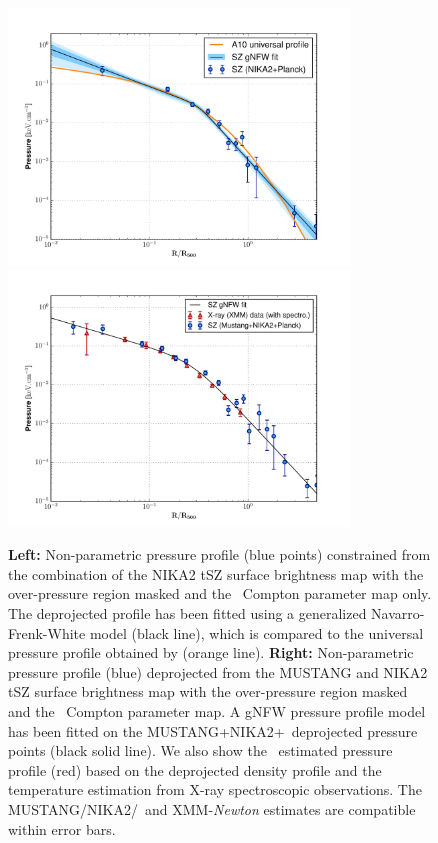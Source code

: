 \documentclass[traditabstract]{aa}
\begin{document}
\begin{figure}[h!]
\centering
\includegraphics[height=6.8cm]{P_profile_NK2_Planck_only.pdf}
\includegraphics[height=6.8cm]{P_profile_Nonparam.pdf}
\caption{{\footnotesize \textbf{Left:} Non-parametric pressure profile (blue points) constrained from the combination of the NIKA2 tSZ surface brightness map with the over-pressure region masked and the \planck\ Compton parameter map only. The deprojected profile has been fitted using a generalized Navarro-Frenk-White \citep[gNFW, ][]{nag07} model (black line), which is compared to the universal pressure profile obtained by \cite{arn10} (orange line). \textbf{Right:} Non-parametric pressure profile (blue) deprojected from the MUSTANG and NIKA2 tSZ surface brightness map with the over-pressure region masked and the \planck\ Compton parameter map. A gNFW pressure profile model has been fitted on the MUSTANG+NIKA2+\planck\ deprojected pressure points (black solid line). We also show the \xmm\ estimated pressure profile (red) based on the deprojected density profile and the temperature estimation from X-ray spectroscopic observations. The MUSTANG/NIKA2/\planck\ and XMM-{\it Newton} estimates are compatible within error bars.}}
\label{fig:Nonparam_profiles}
\end{figure}
\end{document}
